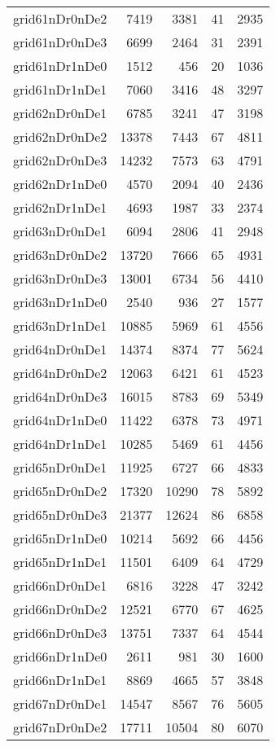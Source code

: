\begin{longtable}{lrrrr}
grid61nDr0nDe2 & 7419 & 3381 & 41 & 2935 \\
grid61nDr0nDe3 & 6699 & 2464 & 31 & 2391 \\
grid61nDr1nDe0 & 1512 & 456 & 20 & 1036 \\
grid61nDr1nDe1 & 7060 & 3416 & 48 & 3297 \\
grid62nDr0nDe1 & 6785 & 3241 & 47 & 3198 \\
grid62nDr0nDe2 & 13378 & 7443 & 67 & 4811 \\
grid62nDr0nDe3 & 14232 & 7573 & 63 & 4791 \\
grid62nDr1nDe0 & 4570 & 2094 & 40 & 2436 \\
grid62nDr1nDe1 & 4693 & 1987 & 33 & 2374 \\
grid63nDr0nDe1 & 6094 & 2806 & 41 & 2948 \\
grid63nDr0nDe2 & 13720 & 7666 & 65 & 4931 \\
grid63nDr0nDe3 & 13001 & 6734 & 56 & 4410 \\
grid63nDr1nDe0 & 2540 & 936 & 27 & 1577 \\
grid63nDr1nDe1 & 10885 & 5969 & 61 & 4556 \\
grid64nDr0nDe1 & 14374 & 8374 & 77 & 5624 \\
grid64nDr0nDe2 & 12063 & 6421 & 61 & 4523 \\
grid64nDr0nDe3 & 16015 & 8783 & 69 & 5349 \\
grid64nDr1nDe0 & 11422 & 6378 & 73 & 4971 \\
grid64nDr1nDe1 & 10285 & 5469 & 61 & 4456 \\
grid65nDr0nDe1 & 11925 & 6727 & 66 & 4833 \\
grid65nDr0nDe2 & 17320 & 10290 & 78 & 5892 \\
grid65nDr0nDe3 & 21377 & 12624 & 86 & 6858 \\
grid65nDr1nDe0 & 10214 & 5692 & 66 & 4456 \\
grid65nDr1nDe1 & 11501 & 6409 & 64 & 4729 \\
grid66nDr0nDe1 & 6816 & 3228 & 47 & 3242 \\
grid66nDr0nDe2 & 12521 & 6770 & 67 & 4625 \\
grid66nDr0nDe3 & 13751 & 7337 & 64 & 4544 \\
grid66nDr1nDe0 & 2611 & 981 & 30 & 1600 \\
grid66nDr1nDe1 & 8869 & 4665 & 57 & 3848 \\
grid67nDr0nDe1 & 14547 & 8567 & 76 & 5605 \\
grid67nDr0nDe2 & 17711 & 10504 & 80 & 6070 \\

\end{longtable}

